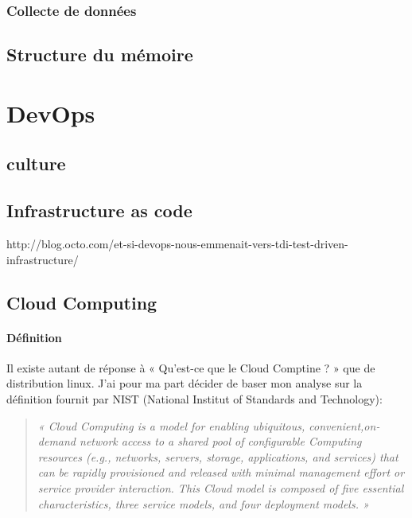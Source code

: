 \documentclass{report}
\begin{document}
      \subsection{Collecte de données}

    \section{Structure du mémoire}

  \chapter{DevOps}

  \section{culture}

  \section{Infrastructure as code}

  http://blog.octo.com/et-si-devops-nous-emmenait-vers-tdi-test-driven-infrastructure/

  \section{Cloud Computing}

    \subsubsection{Définition}
    Il existe autant de réponse à « Qu’est-ce que le Cloud Comptine ? » que de distribution linux. J’ai pour ma part décider de baser mon analyse sur la définition fournit par NIST (National Institut of Standards and Technology):\\

    \begin{quotation}
      \emph{« Cloud Computing is a model for enabling ubiquitous, convenient,on-demand network access to a shared pool of configurable Computing resources (e.g., networks, servers, storage, applications, and services) that can be rapidly provisioned and released with minimal management effort or service provider interaction. This Cloud model is composed of five essential characteristics, three service models, and four deployment models. »}
    \end{quotation}
\end{document}
